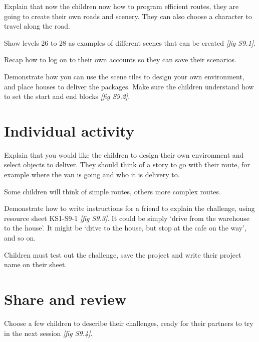 \documentclass{../../../lessonplan}
\begin{document}
\begin{lessonplan}

Explain that now the children now how to program efficient routes, they are going to create their own roads and scenery.
They can also choose a character to travel along the road.

Show levels 26 to 28 as examples of different scenes that can be created \textit{[fig S9.1]}.


Recap how to log on to their own accounts so they can save their scenarios.

Demonstrate how you can use the scene tiles to design your own environment, and place houses to deliver the packages.
Make sure the children understand how to set the start and end blocks \textit{[fig S9.2]}.


\section*{Individual activity}

Explain that you would like the children to design their own environment and select objects to deliver.
They should think of a story to go with their route, for example where the van is going and who it is delivery to.

Some children will think of simple routes, others more complex routes.

Demonstrate how to write instructions for a friend to explain the challenge, using resource sheet KS1-S9-1 \textit{[fig S9.3]}.
It could be simply `drive from the warehouse to the house'. 
It might be `drive to the house, but stop at the cafe on the way', and so on.


Children must test out the challenge, save the project and write their project name on their sheet.

\section*{Share and review}

Choose a few children to describe their challenges, ready for their partners to try in the next session \textit{[fig S9.4]}.




\end{lessonplan}
\end{document}
